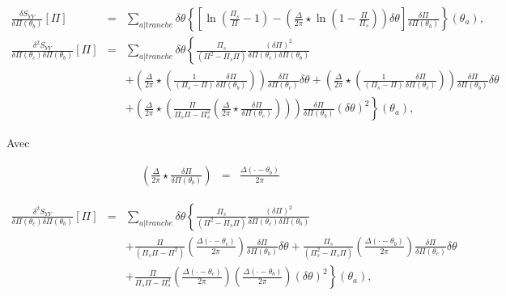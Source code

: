 	\begin{eqnarray}
			\frac{ \delta S_{YY} }{ \delta \Pi(\theta_b)} [\Pi ]  & = & \sum_{a\vert tranche}   \delta \theta \left \{ \left [ \ln \left ( \frac{ \Pi_s }{ \Pi} - 1 \right ) -  \left ( \frac{ \Delta}{2 \pi} \star \ln \left ( 1 - \frac{ \Pi}{ \Pi_s}\right )  \right)  \delta \theta\right ]\frac{\delta \Pi }{ \delta \Pi (\theta_b) } \right \} ( \theta_	a ),\\
			\frac{ \delta^2 S_{YY} }{ \delta \Pi(\theta_c) \delta \Pi(\theta_b)  } [\Pi ]  & = & \sum_{a \vert tranche}   \delta \theta \left \{  \frac{\Pi_s}{(\Pi^2  - \Pi_s\Pi)} \frac{(\delta \Pi)^2}{ \delta \Pi(\theta_c) \delta \Pi(\theta_b)  } \right . \\
		&  &  +  \left . \left (  \frac{\Delta}{2\pi} \star \left ( \frac{1 }{(\Pi_s -\Pi) }  \frac{\delta \Pi}{\delta \Pi(\theta_b)}  \right )   \right ) \frac{\delta \Pi}{\delta \Pi(\theta_c)} \delta \theta+  \left (  \frac{\Delta}{2\pi} \star \left ( \frac{1}{( \Pi_s -  \Pi) } \frac{\delta \Pi}{\delta \Pi(\theta_c)} \right) \right )\frac{\delta \Pi}{\delta \Pi(\theta_b)} \delta \theta  \right . \\
		& & + \left .  \left (  \frac{\Delta}{2\pi} \star \left ( \frac{\Pi }{\Pi_s\Pi - \Pi_s^2 }\left (  \frac{\Delta}{2\pi} \star\frac{\delta \Pi}{\delta \Pi(\theta_c)} \right )\right ) \right ) \frac{\delta \Pi}{\delta \Pi(\theta_b)} (\delta \theta)^2  \right \}(\theta_a),	
	\end{eqnarray}
	
	Avec 
	
	\begin{eqnarray}
			\left  ( \frac{\Delta}{2\pi} \star \frac{\delta \Pi}{\delta \Pi(\theta_b) }  \right ) & = & 	\frac{\Delta ( \cdot - \theta_b )}{2\pi}
		\end{eqnarray}
	
	\begin{eqnarray}
		\frac{ \delta^2 S_{YY} }{ \delta \Pi(\theta_c) \delta \Pi(\theta_b)  } [\Pi ]  & = & \sum_{a \vert tranche}   \delta \theta \left \{  \frac{\Pi_s}{(\Pi^2  - \Pi_s\Pi)} \frac{(\delta \Pi)^2}{ \delta \Pi(\theta_c) \delta \Pi(\theta_b)  } \right . \\
		&  &  +  \left . \frac{\Pi }{(\Pi_s\Pi -\Pi^2) } \left ( \frac{\Delta ( \cdot - \theta_c )}{2\pi}   \right ) \frac{\delta \Pi}{\delta \Pi(\theta_b)} \delta \theta+ \frac{\Pi_s }{( \Pi_s^2 - \Pi_s \Pi) } \left (  \frac{\Delta ( \cdot - \theta_b )}{2\pi} \right ) \frac{\delta \Pi}{\delta \Pi(\theta_c)} \delta \theta \right . \\
		& & + \left .  \frac{\Pi }{\Pi_s\Pi - \Pi_s^2 }\left (  \frac{\Delta ( \cdot - \theta_c )}{2\pi} \right )\left (  \frac{\Delta ( \cdot - \theta_b )}{2\pi} \right )( \delta \theta)^2  \right \}(\theta_a),	
	\end{eqnarray}
	
